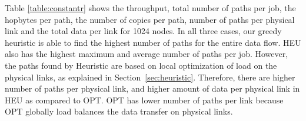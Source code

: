 Table \ref{table:constantr} shows the throughput, total number of paths per job, the hopbytes per path, the number of copies per path, number of paths per physical link and the total data per link for 1024 nodes. In all three cases, our greedy heuristic is able to find the highest number of paths for the entire data flow. HEU also has the highest maximum and average number of paths per job. However, the paths found by Heuristic are based on local optimization of load on the physical links, as explained in Section~\ref{sec:heuristic}. Therefore, there are higher number of paths per physical link, and higher amount of data per physical link in HEU as compared to OPT. OPT has lower number of paths per link because OPT globally load balances the data transfer on physical links.

